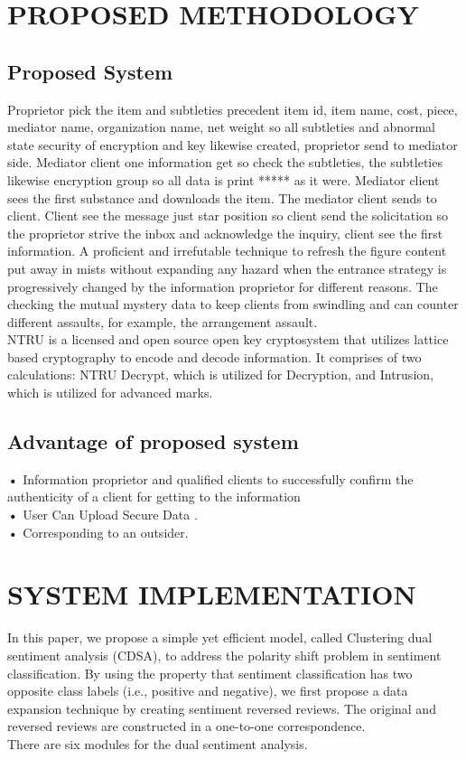 \documentclass[BTech]{srmuthesis}
\begin{document}
\chapter{PROPOSED METHODOLOGY}
\section{Proposed System}
Proprietor pick the item and subtleties precedent item id, item name, cost, piece, mediator name, organization name, net weight so all subtleties and abnormal state security of encryption and key likewise created, proprietor send to mediator side. Mediator client one information get so check the subtleties, the subtleties likewise encryption group so all data is print ***** as it were. Mediator client sees the first substance and downloads the item. The mediator client sends to client. Client see the message just star position so client send the solicitation so the proprietor strive the inbox and acknowledge the inquiry, client see the first information. A proficient and irrefutable technique to refresh the figure content put away in mists without expanding any hazard when the entrance strategy is progressively changed by the information proprietor for different reasons. The checking the mutual mystery data to keep clients from swindling and can counter different assaults, for example, the arrangement assault.\\
NTRU is a licensed and open source open key cryptosystem that utilizes lattice based cryptography to encode and decode information. It comprises of two calculations: NTRU Decrypt, which is utilized for Decryption, and Intrusion, which is utilized for advanced marks.

\section{Advantage of proposed system}
\textbf{•} Information proprietor and qualified clients to successfully confirm the authenticity of a client for getting to the information\\
\textbf{•} User Can Upload Secure Data .\\
\textbf{•} Corresponding to an outsider.\\

\chapter{SYSTEM IMPLEMENTATION}
In this paper, we propose a simple yet efficient model, called Clustering dual sentiment analysis (CDSA), to address the polarity shift problem in sentiment classification. By using the property that sentiment classification has two opposite class labels (i.e., positive and negative), we first propose a data expansion technique by creating sentiment reversed reviews. The original and reversed reviews are constructed in a one-to-one correspondence.\\
There are six modules for the dual sentiment analysis.
\end{document}
